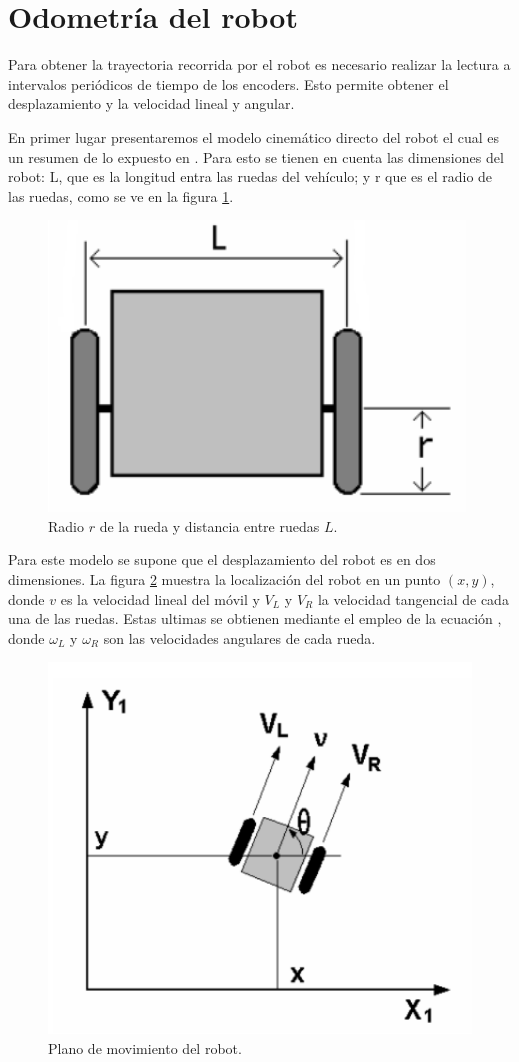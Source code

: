 \section{Odometría del robot}

Para obtener la trayectoria recorrida por el robot es necesario realizar la lectura a intervalos periódicos de tiempo de los encoders. Esto permite obtener el desplazamiento y la velocidad lineal y angular. 

En primer lugar presentaremos el modelo cinemático directo del robot el cual es un resumen de lo expuesto en \cite{cinematicaDirecta}. Para esto se tienen en cuenta las dimensiones del robot: L, que es la longitud entra las ruedas del vehículo; y r que es el radio de las ruedas, como se ve en la figura \ref{imagen:RobotRL}.





\begin{figure}[H]
	\centering
	\includegraphics[width=0.5\linewidth]{imagenes/prototipo/RobotRL}
	\caption[Odometría del robot]{Radio $r$ de la rueda y distancia entre ruedas $L$.}
	\label{imagen:RobotRL}
\end{figure}

Para este modelo se supone que el desplazamiento del robot es en dos dimensiones. La figura \ref{imagen:RobotPlano} muestra la localización del robot en un punto $(x, y) $, donde $v$ es la velocidad lineal del móvil y ${ V }_{ L}$ y ${ V }_{ R}$ la velocidad tangencial de cada una de las ruedas. Estas ultimas se obtienen mediante el empleo de la ecuación , donde ${ \omega }_{ L}$ y ${ \omega}_{ R}$  son las velocidades angulares de cada rueda. 

\begin{figure}[H]
	\centering
	\includegraphics[width=0.5\linewidth]{imagenes/prototipo/RobotPlano}
	\caption[Plano de movimiento del robot]{Plano de movimiento del robot.}
	\label{imagen:RobotPlano}
\end{figure}

